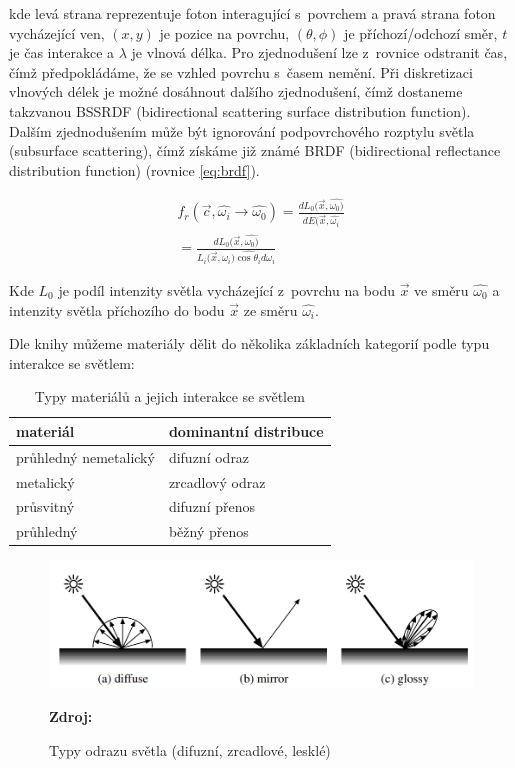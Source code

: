 kde levá strana reprezentuje foton interagující s~povrchem a pravá strana foton vycházející ven, $(x, y)$ je pozice na povrchu, $(\theta, \phi)$ je příchozí/odchozí směr, $t$ je čas interakce a $\lambda$ je vlnová délka. Pro zjednodušení lze z~rovnice odstranit čas, čímž předpokládáme, že se vzhled povrchu s~časem nemění. Při diskretizaci vlnových délek je možné dosáhnout dalšího zjednodušení, čímž dostaneme takzvanou BSSRDF (bidirectional scattering surface distribution function). Dalším zjednodušením může být ignorování podpovrchového rozptylu světla (subsurface scattering), čímž získáme již známé BRDF (bidirectional reflectance distribution function) (rovnice \ref{eq:brdf}).

\begin{equation} \label{eq:brdf}
	\begin{gathered}
		f_r(\vec{c}, \hat{\omega_i} \xrightarrow{} \hat{\omega_0}) = \frac{dL_0(\vec{x}, \hat{\omega_0)}}{dE(\vec{x}, \hat{\omega_i}} \\
		= \frac{dL_0(\vec{x}, \hat{\omega_0)}}{L_i(\vec{x}, \hat{\omega_i)\cos \theta_i d\omega_i}}
	\end{gathered}
\end{equation}

Kde $L_0$ je podíl intenzity světla vycházející z~povrchu na bodu $\vec{x}$ ve směru $\hat{\omega_0}$ a intenzity světla příchozího do bodu $\vec{x}$ ze směru $\hat{\omega_i}$.

Dle knihy \cite{hunter_harold_1987} můžeme materiály dělit do několika základních kategorií podle typu interakce se světlem:

\begin{table}[H]
	\centering
	\begin{tabular}{|l|l|}
		\hline
		materiál              & dominantní distribuce \\ \hline
		průhledný nemetalický & difuzní odraz         \\ \hline
		metalický             & zrcadlový odraz       \\ \hline
		průsvitný             & difuzní přenos        \\ \hline
		průhledný             & běžný přenos          \\ \hline
	\end{tabular}
	\caption{Typy materiálů a jejich interakce se světlem}
\end{table}

\begin{figure}[H]
	\centering
	\includegraphics[scale=1]{obrazky-figures/reflection_types.png}
	\caption{Typy odrazu světla (difuzní, zrcadlové, lesklé)}
	\textbf{Zdroj: \cite{materials}}
	\label{fig:3d_grid}
\end{figure}

